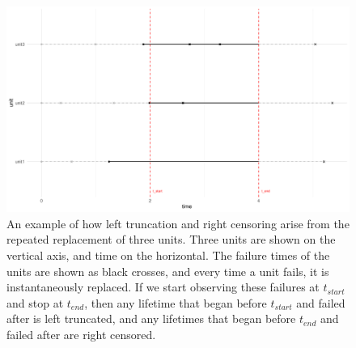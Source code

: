\begin{figure}[h]
    \centering
    \includegraphics[width=1\textwidth]{./figures/left_truncation_w_right_censoring_example.pdf}
    \caption{An example of how left truncation and right censoring arise from the repeated replacement of three units. Three units are shown on the vertical axis, and time on the horizontal. The failure times of the units are shown as black crosses, and every time a unit fails, it is instantaneously replaced. If we start observing these failures at $t_{start}$ and stop at $t_{end}$, then any lifetime that began before $t_{start}$ and failed after is left truncated, and any lifetimes that began before $t_{end}$ and failed after are right censored.}
    \label{fig:left_trunc_and_right_cens_example}
\end{figure}

